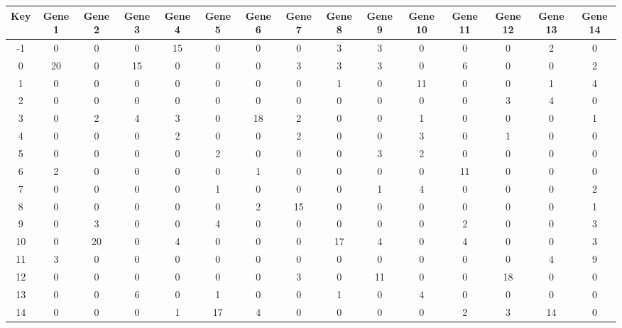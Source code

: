 \begin{tabular}{|c|c|c|c|c|c|c|c|c|c|c|c|c|c|c|}
\hline
Key & Gene 1 & Gene 2 & Gene 3 & Gene 4 & Gene 5 & Gene 6 & Gene 7 & Gene 8 & Gene 9 & Gene 10 & Gene 11 & Gene 12 & Gene 13 & Gene 14 \\
\hline
-1 & 0 & 0 & 0 & 15 & 0 & 0 & 0 & 3 & 3 & 0 & 0 & 0 & 2 & 0 \\
0 & 20 & 0 & 15 & 0 & 0 & 0 & 3 & 3 & 3 & 0 & 6 & 0 & 0 & 2 \\
1 & 0 & 0 & 0 & 0 & 0 & 0 & 0 & 1 & 0 & 11 & 0 & 0 & 1 & 4 \\
2 & 0 & 0 & 0 & 0 & 0 & 0 & 0 & 0 & 0 & 0 & 0 & 3 & 4 & 0 \\
3 & 0 & 2 & 4 & 3 & 0 & 18 & 2 & 0 & 0 & 1 & 0 & 0 & 0 & 1 \\
4 & 0 & 0 & 0 & 2 & 0 & 0 & 2 & 0 & 0 & 3 & 0 & 1 & 0 & 0 \\
5 & 0 & 0 & 0 & 0 & 2 & 0 & 0 & 0 & 3 & 2 & 0 & 0 & 0 & 0 \\
6 & 2 & 0 & 0 & 0 & 0 & 1 & 0 & 0 & 0 & 0 & 11 & 0 & 0 & 0 \\
7 & 0 & 0 & 0 & 0 & 1 & 0 & 0 & 0 & 1 & 4 & 0 & 0 & 0 & 2 \\
8 & 0 & 0 & 0 & 0 & 0 & 2 & 15 & 0 & 0 & 0 & 0 & 0 & 0 & 1 \\
9 & 0 & 3 & 0 & 0 & 4 & 0 & 0 & 0 & 0 & 0 & 2 & 0 & 0 & 3 \\
10 & 0 & 20 & 0 & 4 & 0 & 0 & 0 & 17 & 4 & 0 & 4 & 0 & 0 & 3 \\
11 & 3 & 0 & 0 & 0 & 0 & 0 & 0 & 0 & 0 & 0 & 0 & 0 & 4 & 9 \\
12 & 0 & 0 & 0 & 0 & 0 & 0 & 3 & 0 & 11 & 0 & 0 & 18 & 0 & 0 \\
13 & 0 & 0 & 6 & 0 & 1 & 0 & 0 & 1 & 0 & 4 & 0 & 0 & 0 & 0 \\
14 & 0 & 0 & 0 & 1 & 17 & 4 & 0 & 0 & 0 & 0 & 2 & 3 & 14 & 0 \\
\hline
\end{tabular}